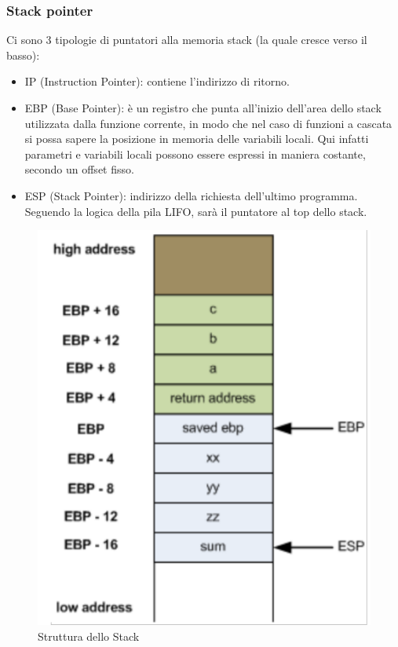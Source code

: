 \documentclass{article}
\begin{document}
\subsubsection{Stack pointer}
Ci sono 3 tipologie di puntatori alla memoria stack (la quale cresce verso il basso):
\begin{itemize}
    \item IP (Instruction Pointer): contiene l’indirizzo di ritorno.
    \item EBP (Base Pointer): è un registro che punta all’inizio dell’area dello stack utilizzata dalla 
    funzione corrente, in modo che nel caso di funzioni a cascata si possa sapere la posizione in memoria 
    delle variabili locali. Qui infatti parametri e variabili locali possono essere espressi in maniera 
    costante, secondo un offset fisso.
    \item ESP (Stack Pointer): indirizzo della richiesta dell’ultimo programma. Seguendo la logica della 
    pila LIFO, sarà il puntatore al top dello stack. 
\end{itemize}
\begin{figure}[H]
    \center
    \includegraphics[scale=0.2]{images/BO4.png}
    \caption{Struttura dello Stack}\label{fig:1}
\end{figure}
\end{document}

